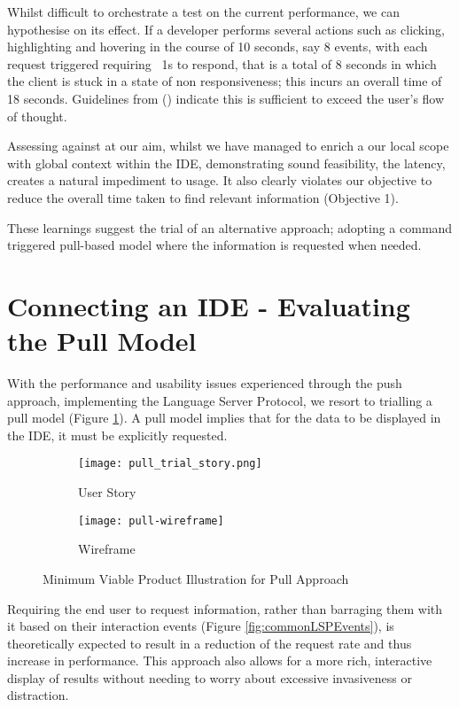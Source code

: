 Whilst difficult to orchestrate a test on the current performance, we can hypothesise on its effect. If a developer performs several actions such as clicking, highlighting and hovering in the course of 10 seconds, say 8 events, with each request triggered requiring ~1s to respond, that is a total of 8 seconds in which the client is stuck in a state of non responsiveness; this incurs an overall time of 18 seconds. Guidelines from \citeauthor{nielsen1994usability} (\citeyear{nielsen1994usability}) indicate this is sufficient to exceed the user's flow of thought. 

Assessing against at our aim, whilst we have managed to enrich a our local scope with global context within the IDE, demonstrating sound feasibility, the latency, creates a natural impediment to usage. It also clearly violates our objective to reduce the overall time taken to find relevant information (Objective 1).

These learnings suggest the trial of an alternative approach; adopting a command triggered pull-based model where the information is requested when needed.

\section{Connecting an IDE - Evaluating the Pull Model}

With the performance and usability issues experienced through the push approach, implementing the Language Server Protocol, we resort to trialling a pull model (Figure \ref{fig:mvpPull}). A pull model implies that for the data to be displayed in the IDE, it must be explicitly requested.

\begin{figure}[h!]
	\centering
	\begin{subfigure}[t]{0.3\textwidth}
		\texttt{[image: pull\_trial\_story.png]}
		\caption{User Story}
	\end{subfigure}
	\begin{subfigure}[t]{0.6\textwidth}
		\texttt{[image: pull-wireframe]}
		\caption{Wireframe}
	\end{subfigure}
	\caption{Minimum Viable Product Illustration for Pull Approach}
	\label{fig:mvpPull}
\end{figure}


Requiring the end user to request information, rather than barraging them with it based on their interaction events (Figure \ref{fig:commonLSPEvents}), is theoretically expected to result in a reduction of the request rate and thus increase in performance. This approach also allows for a more rich, interactive display of results without needing to worry about excessive invasiveness or distraction.


